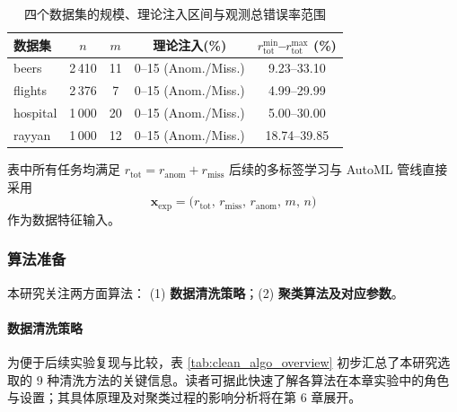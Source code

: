 \documentclass[10pt]{article} %
\numberwithin{equation}{section}
\begin{document}
\begin{table}[htbp]
  \centering
  \setlength{\tabcolsep}{5pt}
  \begin{tabular}{lcccc}
    \toprule
    \textbf{数据集} & $n$ & $m$ & \textbf{理论注入(\%)} & $r_{\text{tot}}^{\min}$--$r_{\text{tot}}^{\max}$ (\%)\\
    \midrule
    beers    & 2\,410 & 11 & 0--15 (Anom./Miss.) & 9.23--33.10 \\
    flights  & 2\,376 & 7  & 0--15 (Anom./Miss.) & 4.99--29.99 \\
    hospital & 1\,000 & 20 & 0--15 (Anom./Miss.) & 5.00--30.00 \\
    rayyan   & 1\,000 & 12 & 0--15 (Anom./Miss.) & 18.74--39.85 \\
    \bottomrule
  \end{tabular}
  \caption{四个数据集的规模、理论注入区间与观测总错误率范围}
  \label{tab:dataset_overview}
\end{table}

\noindent
\textcolor[rgb]{0.00,0.07,1.00}{表中所有任务均满足 \(r_{\text{tot}} = r_{\text{anom}} + r_{\text{miss}}\)
后续的多标签学习与 AutoML 管线直接采用
\[
  \mathbf{x}_{\text{exp}}
  = \bigl(r_{\text{tot}},\,r_{\text{miss}},\,r_{\text{anom}},\,m,\,n\bigr)
\]
作为数据特征输入。}


\subsubsection{算法准备}
\label{sec:algo_prep}

本研究关注两方面算法：
(1) \textbf{数据清洗策略}；(2) \textbf{聚类算法及对应参数}。

\paragraph{数据清洗策略}   
\textcolor[rgb]{0.00,0.07,1.00}{为便于后续实验复现与比较，表 \ref{tab:clean_algo_overview} 初步汇总了本研究选取的 9 种清洗方法的关键信息。读者可据此快速了解各算法在本章实验中的角色与设置；其具体原理及对聚类过程的影响分析将在第 6 章展开。}
\end{document}
